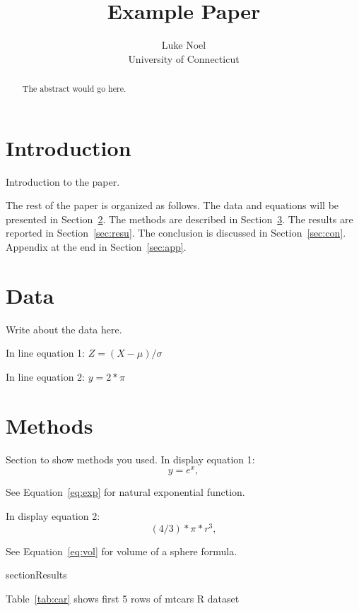 \documentclass[12pt]{article}
\title{Example Paper}
\author{Luke Noel\\
  University of Connecticut
}
\begin{document}
\maketitle

\begin{abstract}
The abstract would go here. 
\end{abstract}


\section{Introduction}
\label{sec:intro}
Introduction to the paper.

The rest of the paper is organized as follows.
The data and equations will be presented in Section~\ref{sec:data}.
The methods are described in Section~\ref{sec:meth}.
The results are reported in Section~\ref{sec:resu}.
The conclusion is discussed in Section~\ref{sec:con}.
Appendix at the end in Section~\ref{sec:app}.


\section{Data}
\label{sec:data}

Write about the data here.

In line equation 1: $Z = (X - \mu)/\sigma$

In line equation 2: $y = 2*\pi$


\section{Methods}
\label{sec:meth}

Section to show methods you used. In display equation 1:
\begin{equation}
  \label{eq:exp}
  y = e^x,
\end{equation}

See Equation~\eqref{eq:exp} for natural exponential function.

In display equation 2:
\begin{equation}
  \label{eq:vol}
  (4/3)*\pi*r^3,
\end{equation}

See Equation~\eqref{eq:vol} for volume of a sphere formula.


section{Results}
\label{sec:resu}

Table~\ref{tab:car} shows first 5 rows of mtcars R dataset
\end{document}
